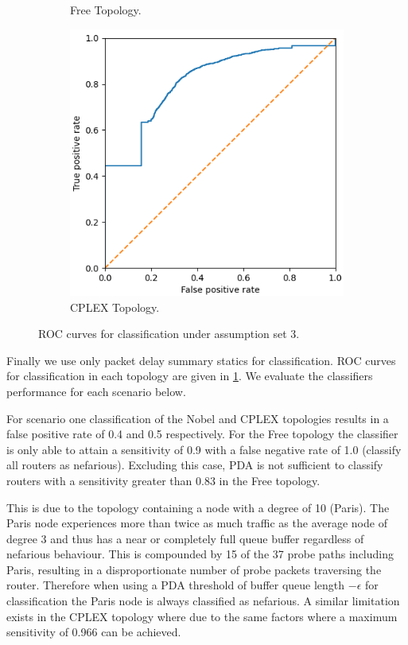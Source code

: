 \begin{figure}
\begin{subfigure}{0.475\textwidth}
        \caption{Free Topology.}
    \end{subfigure}
    \begin{subfigure}{0.475\textwidth}
        \includegraphics[width=\textwidth]{figs/results/norway_case3_roc.png}
        \caption{CPLEX Topology.}
    \end{subfigure}
    \caption{ROC curves for classification under assumption set 3.}
    \label{fig:RA3ROCcurves}
\end{figure}
Finally we use only packet delay summary statics for classification. ROC curves for classification in each topology are given in \cref{fig:RA3ROCcurves}. We evaluate the classifiers performance for each scenario below.\par
For scenario one classification of the Nobel and CPLEX topologies results in a false positive rate of 0.4 and 0.5 respectively. For the Free topology the classifier is only able to attain a sensitivity of 0.9 with a false negative rate of 1.0 (classify all routers as nefarious). Excluding this case, PDA is not sufficient to classify routers with a sensitivity greater than 0.83 in the Free topology.\par
This is due to the topology containing a node with a degree of 10 (Paris). The Paris node experiences more than twice as much traffic as the average node of degree 3 and thus has a near or completely full queue buffer regardless of nefarious behaviour. This is compounded by 15 of the 37 probe paths including Paris, resulting in a disproportionate number of probe packets traversing the router. Therefore when using a PDA threshold of buffer queue length $-\epsilon$ for classification the Paris node is always classified as nefarious. A similar limitation exists in the CPLEX topology where due to the same factors where a maximum sensitivity of 0.966 can be achieved.\par
